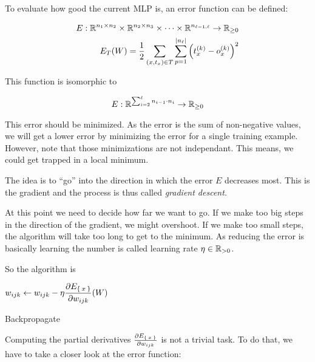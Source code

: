 To evaluate how good the current \gls{MLP} is, an error function can be defined:

\begin{align*}
    E: \mathbb{R}^{n_1 \times n_2} \times \mathbb{R}^{n_2 \times n_3} \times \dots \times \mathbb{R}^{n_{{\ell}-1, {\ell}}} \rightarrow \mathbb{R}_{\geq 0}\\
    E_T(W) = \frac{1}{2} \sum_{(x, t_x) \in T} \sum_{p = 1}^{|n_{\ell}|} \left (t_{x}^{(k)} - o_{x}^{(k)} \right )^2
\end{align*}

This function is isomorphic to 

\[E: \mathbb{R}^{\sum_{i=2}^{\ell} n_{i-1} \cdot n_{i}} \rightarrow \mathbb{R}_{\geq 0}\]

This error should be minimized. As the error is the sum of non-negative values,
we will get a lower error by minimizing the error for a single training example.
However, note that those minimizations are not independant. This means, we could
get trapped in a local minimum.

The idea is to \enquote{go} into the direction in which the error $E$ decreases
most. This is the gradient and the process is thus called \textit{gradient descent}.

At this point we need to decide how far we want to go. If we make too big steps
in the direction of the gradient, we might overshoot. If we make too small steps,
the algorithm will take too long to get to the minimum. As reducing the error
is basically learning the number is called learning rate $\eta \in \mathbb{R}_{> 0}$.

So the algorithm is

\begin{algorithm}[h]
    \begin{algorithmic}
                            \State $\displaystyle w_{ijk} \gets w_{ijk} - \eta \frac{\partial E_{\Set{x}}}{\partial w_{ijk}} (W)$
                        \EndFor
                    \EndFor
                \EndFor
            \EndWhile
        \EndFunction
    \end{algorithmic}
\caption{Backpropagate}
\label{alg:backpropagate}
\end{algorithm}

Computing the partial derivatives $\frac{\partial E_{\Set{x}}}{\partial w_{ijk}}$
is not a trivial task. To do that, we have to take a closer look at the
error function:

